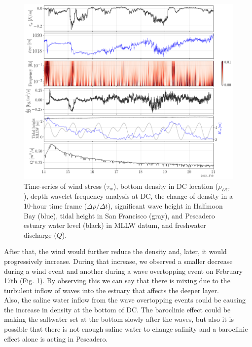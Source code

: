 \documentclass[tesis.tex]{subfiles}
\begin{document}
\begin{figure}[h!]
    \centering
    \includegraphics[width=\textwidth]{Imagenes/mix_wo.png}
    \caption{Time-series of wind stress ($\tau_w$), bottom density in DC location ($\rho_{DC}$), depth wavelet frequency analysis at DC, the change of density in a 10-hour time frame ($\Delta \rho / \Delta t$), significant wave height in Halfmoon Bay (blue), tidal height in San Francisco (gray), and Pescadero estuary water level (black) in MLLW datum, and freshwater discharge ($Q$). }
    \label{fig:mix_wo}
\end{figure}

After that, the wind would further reduce the density and, later, it would progressively increase. During that increase, we observed a smaller decrease during a wind event and another during a wave overtopping event on February 17th (Fig. \ref{fig:mix_wo}). By observing this we can say that there is mixing due to the turbulent inflow of waves into the estuary that affects the deeper layer.\\ 

Also, the saline water inflow from the wave overtopping events could be causing the increase in density at the bottom of DC. The baroclinic effect could be making the saltwater set at the bottom slowly after the waves, but also it is possible that there is not enough saline water to change salinity and a baroclinic effect alone is acting in Pescadero.\\
\end{document}
